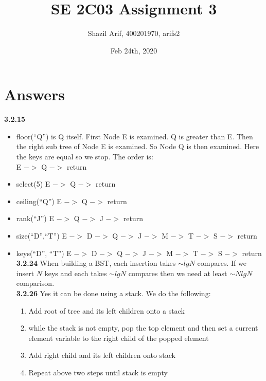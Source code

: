 \documentclass[12pt]{article}
\title{SE 2C03 Assignment 3}
\author{Shazil Arif, 400201970, arifs2}
\date{Feb 24th, 2020}
\begin{document}
\maketitle
\section{Answers}

\textbf{3.2.15}

\begin{itemize}

\item floor(``Q'') is Q itself. First Node E is examined. Q is greater than E. Then the right sub tree of Node E is examined. So Node Q is then examined. Here the keys are equal so we stop. The order is:\\
E $->$ Q $->$ return

\item select(5) E $->$ Q $->$ return

\item ceiling(``Q'') E $->$ Q $->$ return

\item rank(``J'') E $->$ Q $->$ J $->$ return

\item size(``D'',``T'') E $->$ D $->$ Q $->$ J $->$ M $->$ T $->$ S $->$ return


\item keys(``D'', ``T'')  E $->$ D $->$ Q $->$ J $->$ M $->$ T $->$ S $->$ return\\

\textbf{3.2.24} When building a BST, each insertion takes $\sim lg N$  compares. If we insert $N$ keys and each takes $\sim lg N$ compares then we need at least $\sim N lg N$ comparison.\\

\textbf{3.2.26} Yes it can be done using a stack. We do the following:\\

\begin{enumerate}

\item Add root of tree and its left children onto a stack
\item while the stack is not empty, pop the top element and then set a current element variable to the right child of the popped element
\item Add right child and its left children onto stack 
\item Repeat above two steps until stack is empty


\end{enumerate}
\end{itemize}
\end{document}

